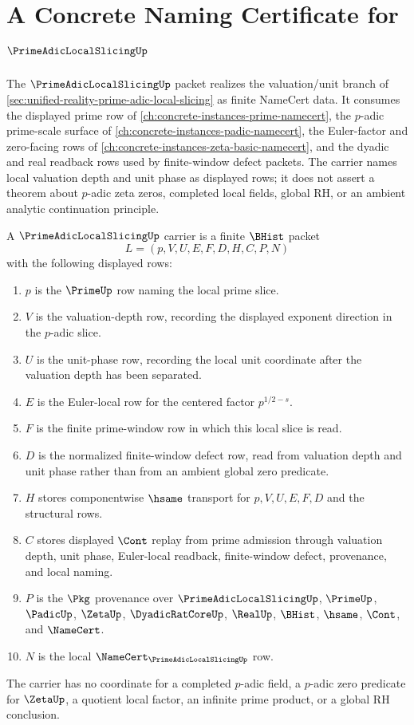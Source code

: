 \chapter{A Concrete Naming Certificate for $\PrimeAdicLocalSlicingUp$}
\label{ch:concrete-instances-prime-adic-local-slicing-namecert}

The $\PrimeAdicLocalSlicingUp$ packet realizes the valuation/unit branch of \autoref{sec:unified-reality-prime-adic-local-slicing} as finite NameCert data. It consumes the displayed prime row of \autoref{ch:concrete-instances-prime-namecert}, the $p$-adic prime-scale surface of \autoref{ch:concrete-instances-padic-namecert}, the Euler-factor and zero-facing rows of \autoref{ch:concrete-instances-zeta-basic-namecert}, and the dyadic and real readback rows used by finite-window defect packets. The carrier names local valuation depth and unit phase as displayed rows; it does not assert a theorem about $p$-adic zeta zeros, completed local fields, global RH, or an ambient analytic continuation principle.

\begin{definition}
\label{def:prime-adic-local-slicing-carrier}
A $\PrimeAdicLocalSlicingUp$ carrier is a finite $\BHist$ packet
$$
L=(p,V,U,E,F,D,H,C,P,N)
$$
with the following displayed rows:
\begin{enumerate}
\item $p$ is the $\PrimeUp$ row naming the local prime slice.
\item $V$ is the valuation-depth row, recording the displayed exponent direction in the $p$-adic slice.
\item $U$ is the unit-phase row, recording the local unit coordinate after the valuation depth has been separated.
\item $E$ is the Euler-local row for the centered factor $p^{1/2-s}$.
\item $F$ is the finite prime-window row in which this local slice is read.
\item $D$ is the normalized finite-window defect row, read from valuation depth and unit phase rather than from an ambient global zero predicate.
\item $H$ stores componentwise $\hsame$ transport for $p,V,U,E,F,D$ and the structural rows.
\item $C$ stores displayed $\Cont$ replay from prime admission through valuation depth, unit phase, Euler-local readback, finite-window defect, provenance, and local naming.
\item $P$ is the $\Pkg$ provenance over $\PrimeAdicLocalSlicingUp$, $\PrimeUp$, $\PadicUp$, $\ZetaUp$, $\DyadicRatCoreUp$, $\RealUp$, $\BHist$, $\hsame$, $\Cont$, and $\NameCert$.
\item $N$ is the local $\NameCert_{\PrimeAdicLocalSlicingUp}$ row.
\end{enumerate}
The carrier has no coordinate for a completed $p$-adic field, a $p$-adic zero predicate for $\ZetaUp$, a quotient local factor, an infinite prime product, or a global RH conclusion.
\end{definition}

